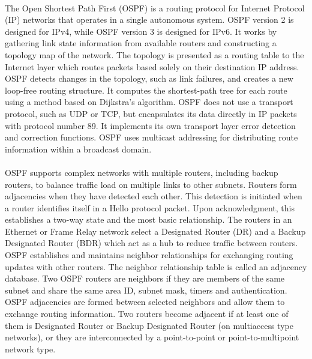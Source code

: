 \paragraph{}The Open Shortest Path First (OSPF) is a routing protocol for Internet Protocol (IP) networks that operates in a single autonomous system. OSPF version 2 is designed for IPv4, while OSPF version 3 is designed for IPv6. It works by gathering link state information from available routers and constructing a topology map of the network. The topology is presented as a routing table to the Internet layer which routes packets based solely on their destination IP address. OSPF detects changes in the topology, such as link failures, and creates a new loop-free routing structure. It computes the shortest-path tree for each route using a method based on Dijkstra's algorithm. OSPF does not use a transport protocol, such as UDP or TCP, but encapsulates its data directly in IP packets with protocol number 89. It implements its own transport layer error detection and correction functions. OSPF uses multicast addressing for distributing route information within a broadcast domain.
\paragraph{}OSPF supports complex networks with multiple routers, including backup routers, to balance traffic load on multiple links to other subnets. Routers form adjacencies when they have detected each other. This detection is initiated when a router identifies itself in a Hello protocol packet. Upon acknowledgment, this establishes a two-way state and the most basic relationship. The routers in an Ethernet or Frame Relay network select a Designated Router (DR) and a Backup Designated Router (BDR) which act as a hub to reduce traffic between routers. OSPF establishes and maintains neighbor relationships for exchanging routing updates with other routers. The neighbor relationship table is called an adjacency database. Two OSPF routers are neighbors if they are members of the same subnet and share the same area ID, subnet mask, timers and authentication. OSPF adjacencies are formed between selected neighbors and allow them to exchange routing information. Two routers become adjacent if at least one of them is Designated Router or Backup Designated Router (on multiaccess type networks), or they are interconnected by a point-to-point or point-to-multipoint network type.
